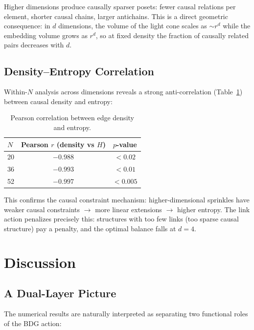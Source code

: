 \documentclass[12pt,a4paper]{article}
\begin{document}
Higher dimensions produce causally sparser posets: fewer causal relations per element,
shorter causal chains, larger antichains. This is a direct geometric consequence:
in $d$ dimensions, the volume of the light cone scales as $\sim r^d$ while the embedding
volume grows as $r^d$, so at fixed density the fraction of causally related pairs decreases with $d$.

\subsection{Density--Entropy Correlation}
\label{sec:density_entropy}

Within-$N$ analysis across dimensions reveals a strong anti-correlation
(Table~\ref{tab:density_entropy_corr}) between causal
density and entropy:

\begin{table}[htbp]
\centering
\caption{Pearson correlation between edge density and entropy.}
\label{tab:density_entropy_corr}
\begin{tabular}{@{}lcc@{}}
\toprule
$N$ & Pearson $r$ (density vs $H$) & $p$-value \\
\midrule
20 & $-0.988$ & $< 0.02$ \\
36 & $-0.993$ & $< 0.01$ \\
52 & $-0.997$ & $< 0.005$ \\
\bottomrule
\end{tabular}
\end{table}

This confirms the causal constraint mechanism: higher-dimensional sprinkles have
weaker causal constraints $\to$ more linear extensions $\to$ higher entropy. The link action
penalizes precisely this: structures with too few links (too sparse causal structure) pay a
penalty, and the optimal balance falls at $d = 4$.




\section{Discussion}
\label{sec:discussion}

\subsection{A Dual-Layer Picture}
\label{sec:dual_layer}

The numerical results are naturally interpreted as separating two
functional roles of the BDG action:
\end{document}

